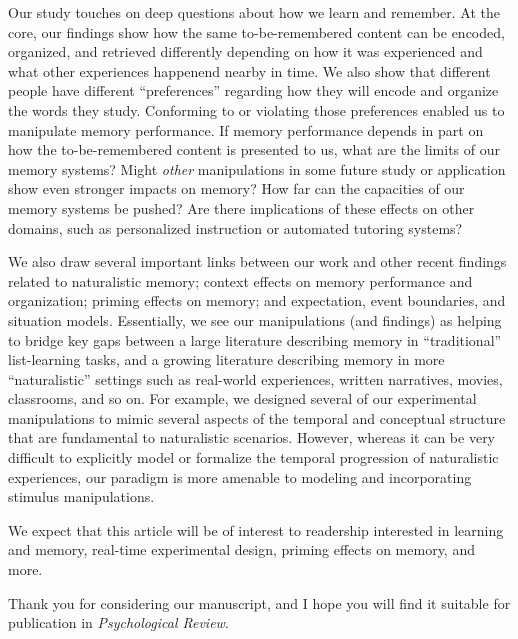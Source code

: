 \documentclass[11pt,stdletter,orderfromtodate,sigleft]{newlfm}
\newcommand{\journal}{Psychological Review}
\begin{document}
\begin{newlfm}
  Our study touches on deep questions about how we learn and remember. At the
  core, our findings show how the same to-be-remembered content can be encoded,
  organized, and retrieved differently depending on how it was experienced and
  what other experiences happenend nearby in time. We also show that different
  people have different ``preferences'' regarding how they will encode and
  organize the words they study. Conforming to or violating those preferences
  enabled us to manipulate memory performance. If memory performance depends in
  part on how the to-be-remembered content is presented to us, what are the
  limits of our memory systems? Might \textit{other} manipulations in some
  future study or application show even stronger impacts on memory? How far can
  the capacities of our memory systems be pushed?  Are there implications
  of these effects on other domains, such as personalized instruction or
  automated tutoring systems?

  We also draw several important links between our work and other recent
  findings related to naturalistic memory; context effects on memory
  performance and organization; priming effects on memory; and expectation,
  event boundaries, and situation models. Essentially, we see our manipulations
  (and findings) as helping to bridge key gaps between a large literature
  describing memory in ``traditional'' list-learning tasks, and a growing
  literature describing memory in more ``naturalistic'' settings such as
  real-world experiences, written narratives, movies, classrooms, and so on.
  For example, we designed several of our experimental manipulations to mimic
  several aspects of the temporal and conceptual structure that are fundamental
  to naturalistic scenarios. However, whereas it can be very difficult to
  explicitly model or formalize the temporal progression of naturalistic
  experiences, our paradigm is more amenable to modeling and incorporating
  stimulus manipulations.

  We expect that this article will be of interest to readership interested in
  learning and memory, real-time experimental design, priming effects on
  memory, and more.

Thank you for considering our manuscript, and I hope you will find it suitable
for publication in \textit{\journal}.


\end{newlfm}
\end{document}
